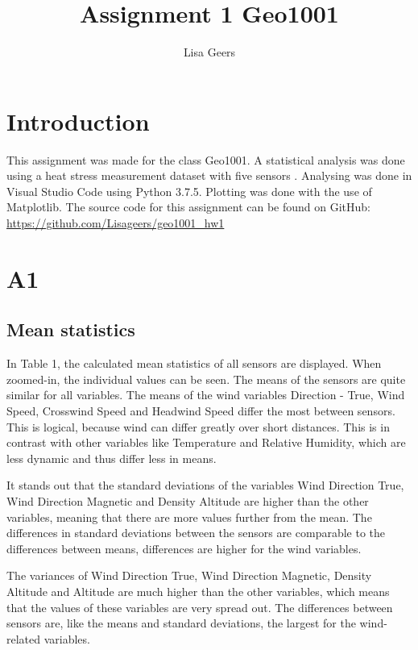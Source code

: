\documentclass{article}
\title{Assignment 1 Geo1001}
\author{Lisa Geers}
\begin{document}
\maketitle

\section{Introduction}
    This assignment was made for the class Geo1001. A statistical analysis was done 
    using a heat stress measurement dataset with five sensors \cite{data} . Analysing was
    done in Visual Studio Code using Python 3.7.5. Plotting was done with the use of Matplotlib.
    The source code for this assignment can be found on GitHub: \url{https://github.com/Lisageers/geo1001_hw1}
   
\section{A1}

    \subsection{Mean statistics}

        In Table 1, the calculated mean statistics of all sensors are displayed. When zoomed-in, the 
        individual values can be seen. The means of the sensors are
        quite similar for all variables. The means of the wind variables Direction - True, Wind Speed, 
        Crosswind Speed and Headwind Speed differ the most between sensors. This is logical, because 
        wind can differ greatly over short distances. This is in contrast with other variables 
        like Temperature and Relative Humidity, which are less dynamic and thus differ less in means.
        \par It stands out that the standard deviations of the variables Wind Direction True, Wind Direction Magnetic 
        and Density Altitude are higher than the other variables, meaning that there are more values 
        further from the mean. The differences in standard deviations between the sensors
        are comparable to the differences between means, differences are higher for the wind variables.
        \par The variances of Wind Direction True, Wind Direction Magnetic, Density Altitude and
        Altitude are much higher than the other variables, which means that the values of
        these variables are very spread out. The differences between sensors are, like the means and
        standard deviations, the largest for the wind-related variables.
\end{document}
